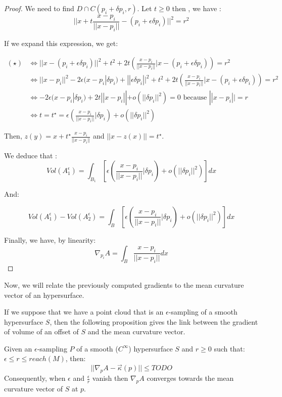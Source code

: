 \begin{proof}
We need to find $ D \cap C(p_i + \delta p_i, r) $. Let $ t \ge 0 $ then , we have :
\begin{equation}
    || x + t \frac{x - p_i}{||x - p_i||} - (p_i + \epsilon \delta p_i) ||^2 = r^2
    \tag{$\star$}
\end{equation}

If we expand this expression, we get:

\begin{align*}
    (\star) & \iff || x - (p_i + \epsilon \delta p_i) ||^2 + t^2 + 2t \left(
        \frac{x-p_i}{|| x - p_i||} | x - (p_i + \epsilon \delta p_i) \right) = r^2 \\
    & \iff || x - p_i || ^2 - 2 \epsilon (x - p_i | \delta p_i) + || \epsilon \delta p_i || ^2 + t^2 + 2t
    \left( \frac{x-p_i}{|| x - p_i||} | x - (p_i + \epsilon \delta p_i) \right) = r^2 \\
    & \iff -2 \epsilon (x - p_i | \delta p_i) + 2t || x - p_i|| + o(||\delta p_i||^2) = 0
    \text{ because } || x - p_i || = r \\
    & \iff t = t^{\star} = \epsilon \left( \frac{x - p_i}{||x - p_i||} | \delta p_i \right) +
    o(||\delta p_i||^2)
\end{align*}

Then, $ z(y) = x + t^{\star} \frac{x - p_i}{||x - p_i||} $ and $ || x - z(x) || =
t^{\star} $.

We deduce that :
$$ Vol(A_1^\epsilon) = \int_{B_1} \left[ \epsilon \left( \frac{x - p_i}{||x - p_i||} | \delta p_i \right) +
o(||\delta p_i||^2) \right] dx $$

And:

$$ Vol(A_1^\epsilon) - Vol(A_2^\epsilon) = \int_{B} \left[ \epsilon \left( \frac{x - p_i}{||x - p_i||} | \delta p_i \right)
+ o(||\delta p_i||^2) \right] dx $$

Finally, we have, by linearity:
$$ \nabla_{p_i} A = \int_{B} \frac{x - p_i}{||x - p_i||} dx $$

\end{proof}

Now, we will relate the previously computed gradients to the mean curvature
vector of an hypersurface.

If we suppose that we have a point cloud that is an $\epsilon$-sampling of a
smooth hypersurface $ S $, then the following proposition gives the link between
the gradient of volume of an offset of $ S $ and the mean curvature vector.

\begin{proposition}
    \label{prop:gradient-mean-curvature}
    Given an $\epsilon$-sampling $ P $ of a smooth ($ C^{\infty} $) hypersurface
    $ S $ and $ r \ge 0 $ such that: $ \epsilon \leq r \leq reach(M) $, then:
    $$ || \nabla_p A - \vec{\kappa}(p) || \leq TODO $$
    Consequently, when $ \epsilon $ and $ \frac{\epsilon}{r} $ vanish then
    $ \nabla_p A $ converges towards the mean curvature vector of $ S $ at $ p $.
\end{proposition}

